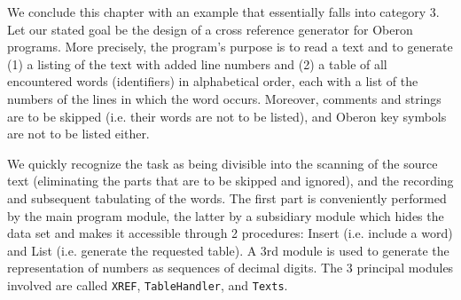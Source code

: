 We conclude this chapter with an example that essentially falls into category 3. Let our stated goal
be the design of a cross reference generator for Oberon programs. More precisely, the program's
purpose is to read a text and to generate (1) a listing of the text with added line numbers and (2) a
table of all encountered words (identifiers) in alphabetical order, each with a list of the numbers of
the lines in which the word occurs. Moreover, comments and strings are to be skipped (i.e. their
words are not to be listed), and Oberon key symbols are not to be listed either.

We quickly recognize the task as being divisible into the scanning of the source text (eliminating the
parts that are to be skipped and ignored), and the recording and subsequent tabulating of the
words. The first part is conveniently performed by the main program module, the latter by a
subsidiary module which hides the data set and makes it accessible through 2 procedures: Insert
(i.e. include a word) and List (i.e. generate the requested table). A 3rd module is used to generate
the representation of numbers as sequences of decimal digits. The 3 principal modules involved
are called \verb|XREF|, \verb|TableHandler|, and \verb|Texts|.

